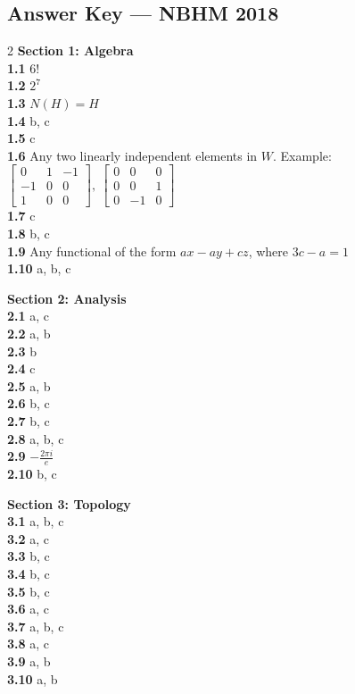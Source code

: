 \documentclass[11pt,a4paper]{article}
\newcommand{\examsec}[1]{%
  \subsection*{#1}
  \vspace{-2pt}
}
\begin{document}
\examsec{Answer Key --- NBHM 2018}
\begin{multicols}{2}
\textbf{Section 1: Algebra}\\
\textbf{1.1} $6!$\\
\textbf{1.2} $2^7$\\
\textbf{1.3} $N(H) = H$\\
\textbf{1.4} b, c\\
\textbf{1.5} c\\
\textbf{1.6} Any two linearly independent elements in $W$. Example: $\begin{bmatrix} 0 & 1 & -1 \\ -1 & 0 & 0 \\ 1 & 0 & 0 \end{bmatrix},\ \begin{bmatrix} 0 & 0 & 0 \\ 0 & 0 & 1 \\ 0 & -1 & 0 \end{bmatrix}$\\
\textbf{1.7} c\\
\textbf{1.8} b, c\\
\textbf{1.9} Any functional of the form $ax - ay + cz$, where $3c - a = 1$\\
\textbf{1.10} a, b, c

\medskip
\textbf{Section 2: Analysis}\\
\textbf{2.1} a, c\\
\textbf{2.2} a, b\\
\textbf{2.3} b\\
\textbf{2.4} c\\
\textbf{2.5} a, b\\
\textbf{2.6} b, c\\
\textbf{2.7} b, c\\
\textbf{2.8} a, b, c\\
\textbf{2.9} $-\frac{2\pi i}{e}$\\
\textbf{2.10} b, c

\medskip
\textbf{Section 3: Topology}\\
\textbf{3.1} a, b, c\\
\textbf{3.2} a, c\\
\textbf{3.3} b, c\\
\textbf{3.4} b, c\\
\textbf{3.5} b, c\\
\textbf{3.6} a, c\\
\textbf{3.7} a, b, c\\
\textbf{3.8} a, c\\
\textbf{3.9} a, b\\
\textbf{3.10} a, b


\end{multicols}
\end{document}
